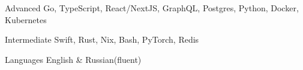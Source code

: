
\begin{cvskills}

  \cvskill
    {Advanced}
    {Go, TypeScript, React/NextJS, GraphQL, Postgres, Python, Docker, Kubernetes}

    \cvskill
    {Intermediate}
    {Swift, Rust, Nix, Bash, PyTorch, Redis}

  \cvskill
    {Languages}
    {English \& Russian(fluent)}

\end{cvskills}
